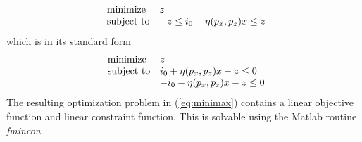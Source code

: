 \documentclass[a4paper,10pt]{article}
\begin{document}
\begin{equation}
\begin{array}{ll@{}ll}
\text{minimize}  & z \\
\text{subject to}& -z \leq i_0 + \eta(p_x,p_z)x \leq z
\end{array}
\end{equation}
which is in its standard form
\begin{equation} \label{eq:minimax}
\begin{array}{ll@{}ll}
\text{minimize}  & z \\
\text{subject to}& i_0 + \eta(p_x,p_z)x -z \leq 0 \\
                  &-i_0 - \eta(p_x,p_z)x -z \leq 0
\end{array}
\end{equation}
The resulting optimization problem in (\ref{eq:minimax}) contains a linear objective function and linear constraint function. This is solvable using the Matlab routine \textit{fmincon}.



\end{document}
